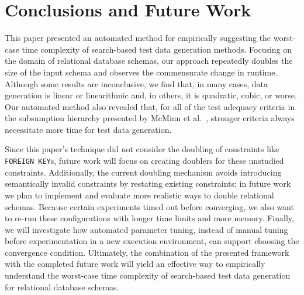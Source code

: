 
\vspace*{-.05in}
\section{Conclusions and Future Work}
\vspace*{-.1in}


This paper presented an automated method for empirically suggesting the worst-case time complexity of search-based test
data generation methods. Focusing on the domain of relational database schemas, our approach repeatedly doubles the size
of the input schema and observes the commensurate change in runtime. Although some results are inconclusive, we find
that, in many cases, data generation is linear or linearithmic and, in others, it is quadratic, cubic, or worse.  Our
automated method also revealed that, for all of the test adequacy criteria in the subsumption hierarchy presented by
McMinn et al.~\cite{mcminn2015}, stronger criteria always necessitate more time for test data generation.

Since this paper's technique did not consider the doubling of constraints like {\tt FOREIGN KEY}s, future work will
focus on creating doublers for these unstudied constraints. Additionally, the current doubling mechanism avoids
introducing semantically invalid constraints by restating existing constraints; in future work we plan to implement and
evaluate more realistic ways to double relational schemas. Because certain experiments timed out before converging, we
also want to re-run these configurations with longer time limits and more memory. Finally, we will investigate how
automated parameter tuning, instead of manual tuning before experimentation in a new execution environment, can
support choosing the convergence condition. Ultimately, the combination of the presented framework with the completed
future work will yield an effective way to empirically understand the worst-case time complexity of search-based
test data generation for relational database schemas.

